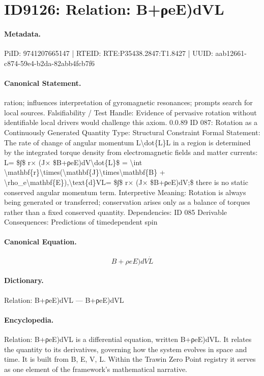 \section*{ID9126: Relation: B+ρeE)dVL}
\paragraph{Metadata.}
PiID: 9741207665147 | RTEID: RTE:P35438.2847:T1.8427 | UUID: aab12661-c874-59e4-b2da-82abb4fcb7f6

\paragraph{Canonical Statement.}
ration; influences interpretation of gyromagnetic resonances; prompts search for local sources. Falsifiability / Test Handle: Evidence of pervasive rotation without identifiable local drivers would challenge this axiom. 0.0.89 ID 087: Rotation as a Continuously Generated Quantity Type: Structural Constraint Formal Statement: The rate of change of angular momentum L\textbackslash{}dot\{L\}L in a region is determined by the integrated torque density from electromagnetic fields and matter currents: L= \$∫\$ r× (J× \$B+ρeE)dV\textbackslash{}dot\{L\}\$ = \textbackslash{}int \textbackslash{}mathbf\{r\}\textbackslash{}times(\textbackslash{}mathbf\{J\}\textbackslash{}times\textbackslash{}mathbf\{B\} + \textbackslash{}rho\_e\textbackslash{}mathbf\{E\}),\textbackslash{}text\{d\}VL= \$∫\$ r× (J× \$B+ρeE)dV;\$ there is no static conserved angular momentum term. Interpretive Meaning: Rotation is always being generated or transferred; conservation arises only as a balance of torques rather than a fixed conserved quantity. Dependencies: ID 085 Derivable Consequences: Predictions of timedependent spin

\paragraph{Canonical Equation.}
\[
B+ρeE)dV\dot{L}
\]

\paragraph{Dictionary.}
Relation: B+ρeE)dVL — B+ρeE)dVL

\paragraph{Encyclopedia.}
Relation: B+ρeE)dVL is a differential equation, written B+ρeE)dVL. It relates the quantity to its derivatives, governing how the system evolves in space and time. It is built from B, E, V, L. Within the Trawin Zero Point registry it serves as one element of the framework's mathematical narrative.
